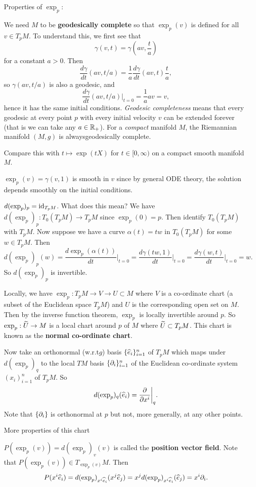 Properties of $\exp_p$:
\begin{enum}
  \io We need $M$ to be \textbf{geodesically complete} so that $\exp_p(v)$ is defined for all $v\in T_pM$.
  To understand this, we first see that
  \[ \gamma(v,t) = \gamma \left( av, \frac ta \right) \]
  for a constant $a>0$.
  Then
  \[ \frac{d\gamma}{dt}(av,t/a) = \frac1a \frac{d\gamma}{dt}(av,t)\frac ta, \]
  so $\gamma(av,t/a)$ is also a geodesic, and
  \[ \frac{d\gamma}{dt}(av,t/a)\big\vert_{t=0} = \frac1a av=v, \]
  hence it has the same initial conditions.
  \emph{Geodesic completeness} means that every geodesic at every point $p$ with every initial velocity $v$ can be extended forever (that is we can take any $a\in\mathbb{R}_+$).
  For a \emph{compact} manifold $M$, the Riemannian manifold $(M,g)$ is alwaysgeodesically complete.

  \begin{exer}
    Compare this with $t\mapsto\exp(tX)$ for $t\in[0,\infty)$ on a compact smooth manifold $M$.
  \end{exer}

  \io $\exp_p(v)=\gamma(v,1)$ is smooth in $v$ since by general ODE theory, the solution depends smoothly on the initial conditions.

  \io $d(\exp_p)_p=\operatorname{id}_{T_pM}$.
  What does this mean?
  We have $d(\exp_p)_p: T_0(T_pM) \to T_pM$ since $\exp_p(0)=p$.
  Then identify $T_0(T_pM)$ with $T_pM$.
  Now suppose we have a curve $\alpha(t)=tw$ in $T_0(T_pM)$ for some $w\in T_pM$.
  Then
  \[ d(\exp_p)_p(w) = \frac{d\exp_p(\alpha(t))}{dt}\bigg\vert_{t=0} = \frac{d\gamma(tw,1)}{dt}\bigg\vert_{t=0} = \frac{d\gamma(w,t)}{dt}\bigg\vert_{t=0} = w. \]
  So $d(\exp_p)_p$ is invertible.
\end{enum}

Locally, we have $\exp_p: T_pM \to V \to U \subset M$ where $V$ is a co-ordinate chart (a subset of the Euclidean space $T_pM$) and $U$ is the corresponding open set on $M$.
Then by the inverse function theorem, $\exp_p$ is locally invertible around $p$.
So $\exp_p: \widetilde U \to M$ is a local chart around $p$ of $M$ where $\widetilde U \subset T_pM$.
This chart is known as the \textbf{normal co-ordinate chart}.

Now take an orthonormal (w.r.t\@ $g$) basis $\{\widehat e_i\}_{i=1}^n$ of $T_pM$ which maps under $d(\exp_p)_q$ to the local $TM$ basis $\{\partial_i\}_{i=1}^n$ of the Euclidean co-ordinate system $(x_i)_{i=1}^n$ of $T_pM$.
So
\[ d(\exp_p)_q(\widehat e_i) = \frac{\partial}{\partial x^i}\bigg\vert_q. \]
Note that $\{\partial_i\}$ is orthonormal at $p$ but not, more generally, at any other points.

More properties of this chart

\begin{itm}
  \io $P(\exp_p(v))=d(\exp_p)_v(v)$ is called the \textbf{position vector field}.
  Note that $P(\exp_p(v)) \in T_{\exp_p(v)}M$.
  Then
  \[ P(x^i\widehat e_i) = d(\exp_p)_{x^i\widehat e_i}(x^j \widehat e_j) = x^j d(\exp_p)_{x^i \widehat e_i} (\widehat e_j) = x^i\partial_i. \]
\end{itm}
